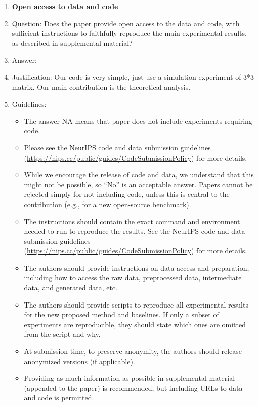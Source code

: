 \documentclass{article}
\theoremstyle{definition}
\begin{document}
\begin{enumerate}
\item {\bf Open access to data and code}
    \item[] Question: Does the paper provide open access to the data and code, with sufficient instructions to faithfully reproduce the main experimental results, as described in supplemental material?
    \item[] Answer: \answerNo{} %
    \item[] Justification: Our code is very simple, just use a simulation experiment of 3*3 matrix. Our main contribution is the theoretical analysis.
    \item[] Guidelines:
    \begin{itemize}
        \item The answer NA means that paper does not include experiments requiring code.
        \item Please see the NeurIPS code and data submission guidelines (\url{https://nips.cc/public/guides/CodeSubmissionPolicy}) for more details.
        \item While we encourage the release of code and data, we understand that this might not be possible, so “No” is an acceptable answer. Papers cannot be rejected simply for not including code, unless this is central to the contribution (e.g., for a new open-source benchmark).
        \item The instructions should contain the exact command and environment needed to run to reproduce the results. See the NeurIPS code and data submission guidelines (\url{https://nips.cc/public/guides/CodeSubmissionPolicy}) for more details.
        \item The authors should provide instructions on data access and preparation, including how to access the raw data, preprocessed data, intermediate data, and generated data, etc.
        \item The authors should provide scripts to reproduce all experimental results for the new proposed method and baselines. If only a subset of experiments are reproducible, they should state which ones are omitted from the script and why.
        \item At submission time, to preserve anonymity, the authors should release anonymized versions (if applicable).
        \item Providing as much information as possible in supplemental material (appended to the paper) is recommended, but including URLs to data and code is permitted.
    \end{itemize}



\end{enumerate}
\end{document}
